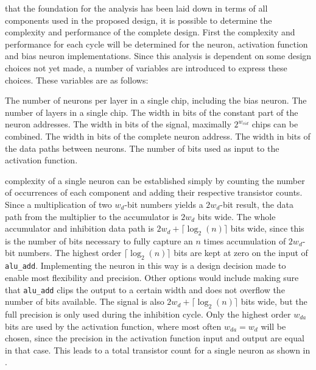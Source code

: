  that the foundation for the analysis has been laid down in terms of all components used in the proposed design, it is possible to determine the complexity and performance of the complete design. First the complexity and performance for each cycle will be determined for the neuron, activation function and bias neuron implementations. Since this analysis is dependent on some design choices not yet made, a number of variables are introduced to express these choices. These variables are as follows:
\begin{itemize}
   The number of neurons per layer in a single chip, including the bias neuron.
   The number of layers in a single chip.
   The width in bits of the constant part of the neuron addresses.
   The width in bits of the  signal, maximally $2^{w_{cid}}$ chips can be combined.
   The width in bits of the complete neuron address.
   The width in bits of the data paths between neurons.
   The number of bits used as input to the activation function.
\end{itemize}

 complexity of a single neuron can be established simply by counting the number of occurrences of each component and adding their respective transistor counts. Since a multiplication of two $w_{d}$-bit numbers yields a $2w_{d}$-bit result, the data path from the multiplier to the accumulator is $2w_{d}$ bits wide. The whole accumulator and inhibition data path is $2w_{d} + \lceil\log_{2}(n)\rceil$ bits wide, since this is the number of bits necessary to fully capture an $n$ times accumulation of $2w_{d}$-bit numbers. The highest order $\lceil\log_{2}(n)\rceil$ bits are kept at zero on the  input of \texttt{alu\_add}. Implementing the neuron in this way is a design decision made to enable most flexibility and precision. Other options would include making sure that \texttt{alu\_add} clips the output to a certain width and does not overflow the number of bits available. The  signal is also $2w_{d} + \lceil\log_{2}(n)\rceil$ bits wide, but the full precision is only used during the inhibition cycle. Only the highest order $w_{da}$ bits are used by the activation function, where most often $w_{da} = w_{d}$ will be chosen, since the precision in the activation function input and output are equal in that case. This leads to a total transistor count for a single neuron as shown in .

